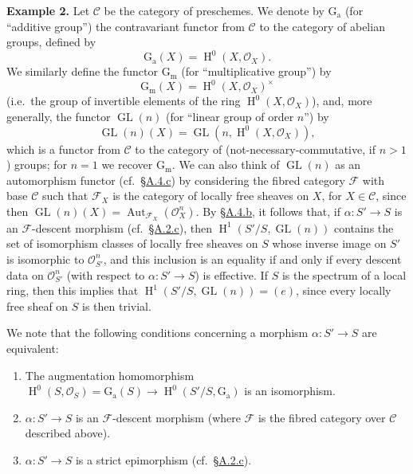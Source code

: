 \documentclass{article}
\providecommand{\tightlist}{%
  \setlength{\itemsep}{0pt}\setlength{\parskip}{0pt}}
\newenvironment{rmenv}[1]
  {\phantomsection\par\smallskip\noindent\textbf{#1.}\rmfamily}
  {\par\smallskip}
\newcommand{\oldpage}[1]{\marginpar{\footnotesize$\Big\vert$ \textit{p.~#1}}}
\theoremstyle{definition}
\theoremstyle{definition}
\theoremstyle{definition}
\theoremstyle{definition}
\theoremstyle{remark}
\begin{document}
\leavevmode{}%
\begin{rmenv}{Example 2}
Let \({\mathcal{C}}\) be the category of preschemes.
We denote by \(\operatorname{G_a}\) (for ``additive group'') the contravariant functor from \({\mathcal{C}}\) to the category of abelian groups, defined by
\[
  \operatorname{G_a}(X) = \operatorname{H}^0(X,{\mathscr{O}}_X).
\]
We similarly define the functor \(\operatorname{G_m}\) (for ``multiplicative group'') by
\[
  \operatorname{G_m}(X) = \operatorname{H}^0(X,{\mathscr{O}}_X)^\times
\]
\oldpage{190-15}(i.e.~the group of invertible elements of the ring \(\operatorname{H}^0(X,{\mathscr{O}}_X)\)), and, more generally, the functor \(\operatorname{GL}(n)\) (for ``linear group of order \(n\)'') by
\[
  \operatorname{GL}(n)(X) = \operatorname{GL}(n,\operatorname{H}^0(X,{\mathscr{O}}_X)),
\]
which is a functor from \({\mathcal{C}}\) to the category of (not-necessary-commutative, if \(n>1\)) groups;
for \(n=1\) we recover \(\operatorname{G_m}\).
We can also think of \(\operatorname{GL}(n)\) as an automorphism functor (cf.~\protect\hyperlink{fga-3-i-section-A.4.c}{§A.4.c}) by considering the fibred category \({\mathcal{F}}\) with base \({\mathcal{C}}\) such that \({\mathcal{F}}_X\) is the category of locally free sheaves on \(X\), for \(X\in{\mathcal{C}}\), since then \(\operatorname{GL}(n)(X)=\operatorname{Aut}_{{\mathcal{F}}_X}({\mathscr{O}}_X^n)\).
By \protect\hyperlink{fga-3-i-section-A.4.b}{§A.4.b}, it follows that, if \(\alpha\colon S'\to S\) is an \({\mathcal{F}}\)-descent morphism (cf.~\protect\hyperlink{fga-3-i-section-A.2.c}{§A.2.c}), then \(\operatorname{H}^1(S'/S,\operatorname{GL}(n))\) contains the set of isomorphism classes of locally free sheaves on \(S\) whose inverse image on \(S'\) is isomorphic to \({\mathscr{O}}_{S'}^n\), and this inclusion is an equality if and only if every descent data on \({\mathscr{O}}_{S'}^n\) (with respect to \(\alpha\colon S'\to S\)) is effective.
If \(S\) is the spectrum of a local ring, then this implies that \(\operatorname{H}^1(S'/S,\operatorname{GL}(n))=(e)\), since every locally free sheaf on \(S\) is then trivial.

We note that the following conditions concerning a morphism \(\alpha\colon S'\to S\) are equivalent:

\begin{enumerate}
\def\labelenumi{\roman{enumi}.}
\tightlist
\item
  The augmentation homomorphism \(\operatorname{H}^0(S,{\mathscr{O}}_S) = \operatorname{G_a}(S)\to\operatorname{H}^0(S'/S,\operatorname{G_a})\) is an isomorphism.
\item
  \(\alpha\colon S'\to S\) is an \({\mathcal{F}}\)-descent morphism (where \({\mathcal{F}}\) is the fibred category over \({\mathcal{C}}\) described above).
\item
  \(\alpha\colon S'\to S\) is a strict epimorphism (cf.~\protect\hyperlink{fga-3-i-section-A.2.c}{§A.2.c}).
\end{enumerate}


\end{rmenv}
\end{document}
